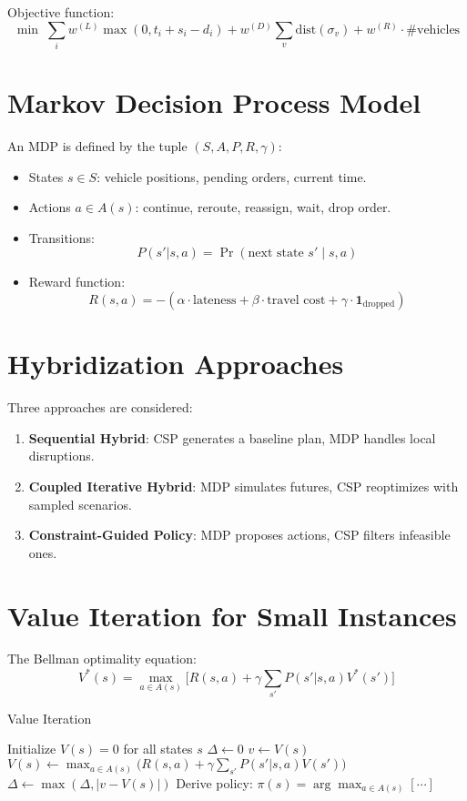 \documentclass[a4paper,12pt]{report}
\begin{document}
Objective function:
\[
\min \; \sum_{i} w^{(L)} \max(0, t_i + s_i - d_i) 
+ w^{(D)} \sum_{v} \text{dist}(\sigma_v) 
+ w^{(R)} \cdot \#\text{vehicles}
\]

\section{Markov Decision Process Model}
An MDP is defined by the tuple 
\((S, A, P, R, \gamma)\):
\begin{itemize}
    \item States \(s \in S\): vehicle positions, pending orders, current time.
    \item Actions \(a \in A(s)\): continue, reroute, reassign, wait, drop order.
    \item Transitions: 
    \[
    P(s'|s,a) = \Pr(\text{next state } s' \mid s, a)
    \]
    \item Reward function:
    \[
    R(s,a) = - \left( \alpha \cdot \text{lateness} 
    + \beta \cdot \text{travel cost}
    + \gamma \cdot \mathbf{1}_{\text{dropped}} \right)
    \]
\end{itemize}


\section{Hybridization Approaches}
Three approaches are considered:
\begin{enumerate}
    \item \textbf{Sequential Hybrid}: CSP generates a baseline plan, MDP handles local disruptions.
    \item \textbf{Coupled Iterative Hybrid}: MDP simulates futures, CSP reoptimizes with sampled scenarios.
    \item \textbf{Constraint-Guided Policy}: MDP proposes actions, CSP filters infeasible ones.
\end{enumerate}

\section{Value Iteration for Small Instances}
The Bellman optimality equation:
\[
V^*(s) = \max_{a \in A(s)} \Big[ R(s,a) + \gamma \sum_{s'} P(s'|s,a) V^*(s') \Big]
\]

\begin{algorithm}[h!]
\caption{Value Iteration}
\begin{algorithmic}
\STATE Initialize $V(s)=0$ for all states $s$
\REPEAT
    \STATE $\Delta \gets 0$
        \STATE $v \gets V(s)$
        \STATE $V(s) \gets \max_{a \in A(s)} 
        \Big( R(s,a) + \gamma \sum_{s'} P(s'|s,a) V(s') \Big)$
        \STATE $\Delta \gets \max(\Delta, |v - V(s)|)$
    \ENDFOR
\UNTIL{$\Delta < \theta$}
\STATE Derive policy: $\pi(s) = \arg\max_{a \in A(s)} [ \cdots ]$
\end{algorithmic}
\end{algorithm}
\end{document}
